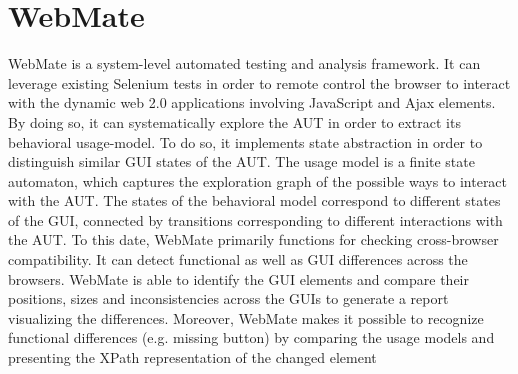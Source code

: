 \section{WebMate}
\label{sec:WebMate}
WebMate is a system-level automated testing and analysis framework. It can leverage existing Selenium tests in order to remote control the browser to interact with the dynamic web 2.0 applications involving JavaScript and Ajax elements. By doing so, it can systematically explore the AUT in order to extract its behavioral usage-model. To do so, it implements state abstraction in order to distinguish similar GUI states of the AUT. The usage model is a finite state automaton, which captures the exploration graph of the possible ways to interact with the AUT. The states of the behavioral model correspond to different states of the GUI, connected by transitions corresponding to different interactions with the AUT. 
To this date, WebMate primarily functions for checking cross-browser compatibility. It can detect functional as well as GUI differences across the browsers. WebMate is able to identify the GUI elements and compare their positions, sizes and inconsistencies across the GUIs to generate a report visualizing the differences. Moreover, WebMate makes it possible to recognize functional differences (e.g. missing button) by comparing the usage models and presenting the XPath representation of the changed element